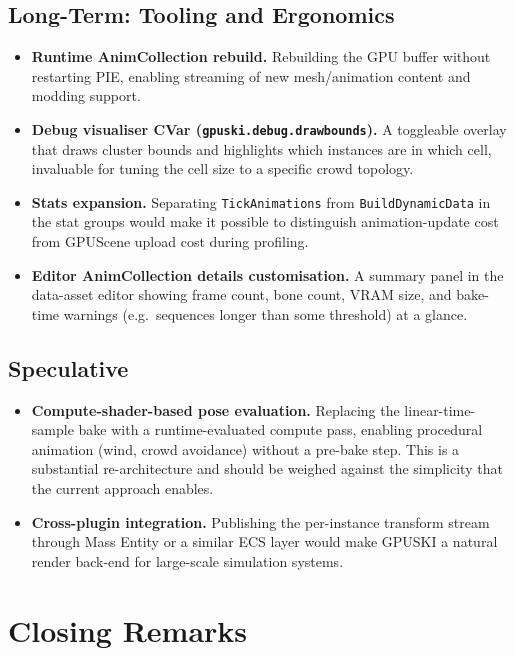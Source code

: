 \documentclass[11pt, a4paper]{article}
\begin{document}
\subsection{Long-Term: Tooling and Ergonomics}

\begin{itemize}[leftmargin=1.5em]
    \item \textbf{Runtime AnimCollection rebuild.} Rebuilding the GPU buffer without restarting PIE, enabling streaming of new mesh/animation content and modding support.
    \item \textbf{Debug visualiser CVar (\texttt{gpuski.debug.drawbounds}).} A toggleable overlay that draws cluster bounds and highlights which instances are in which cell, invaluable for tuning the cell size to a specific crowd topology.
    \item \textbf{Stats expansion.} Separating \texttt{TickAnimations} from \texttt{BuildDynamicData} in the stat groups would make it possible to distinguish animation-update cost from GPUScene upload cost during profiling.
    \item \textbf{Editor AnimCollection details customisation.} A summary panel in the data-asset editor showing frame count, bone count, VRAM size, and bake-time warnings (e.g.\ sequences longer than some threshold) at a glance.
\end{itemize}

\subsection{Speculative}

\begin{itemize}[leftmargin=1.5em]
    \item \textbf{Compute-shader-based pose evaluation.} Replacing the linear-time-sample bake with a runtime-evaluated compute pass, enabling procedural animation (wind, crowd avoidance) without a pre-bake step. This is a substantial re-architecture and should be weighed against the simplicity that the current approach enables.
    \item \textbf{Cross-plugin integration.} Publishing the per-instance transform stream through Mass Entity or a similar ECS layer would make GPUSKI a natural render back-end for large-scale simulation systems.
\end{itemize}

\section{Closing Remarks}
\end{document}
